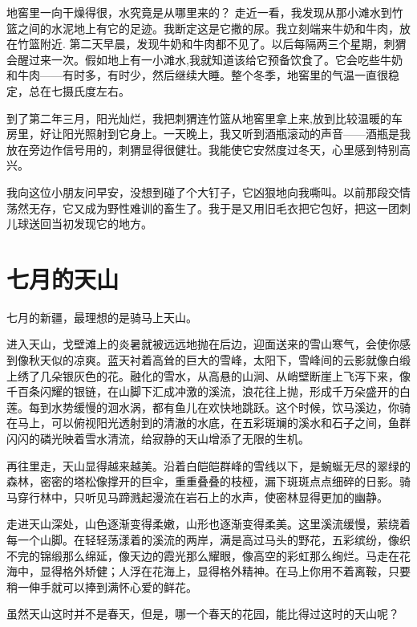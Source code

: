 \documentclass[12pt,UTF-8,openany]{ctexbook}
\begin{document}
\begin{large}
    地窖里一向干燥得很，水究竟是从哪里来的？ 走近一看，我发现从那小滩水到竹篮之间的水泥地上有它的足迹。我断定这是它撒的尿。我立刻端来牛奶和牛肉，放在竹篮附近. 第二天早晨，发现牛奶和牛肉都不见了。以后每隔两三个星期，刺猬会醒过来一次。假如地上有一小滩水,我就知道该给它预备饮食了。它会吃些牛奶和牛肉——有时多，有时少，然后继续大睡。整个冬季，地窖里的气温一直很稳定，总在七摄氏度左右。
    
    到了第二年三月，阳光灿烂，我把刺猬连竹篮从地窖里拿上来,放到比较温暖的车房里，好让阳光照射到它身上。一天晚上，我又听到酒瓶滚动的声音——酒瓶是我放在旁边作信号用的，刺猬显得很健壮。我能使它安然度过冬天，心里感到特别高兴。
    
    我向这位小朋友问早安，没想到碰了个大钉子，它凶狠地向我嘶叫。以前那段交情荡然无存，它又成为野性难训的畜生了。我于是又用旧毛衣把它包好，把这一团刺儿球送回当初发现它的地方。
    
\end{large}



\chapter{七月的天山}

\begin{large}
    
    七月的新疆，最理想的是骑马上天山。
    
    进入天山，戈壁滩上的炎暑就被远远地抛在后边，迎面送来的雪山寒气，会使你感到像秋天似的凉爽。蓝天衬着高耸的巨大的雪峰，太阳下，雪峰间的云影就像白缎上绣了几朵银灰色的花。融化的雪水，从高悬的山涧、从峭壁断崖上飞泻下来，像千百条闪耀的银链，在山脚下汇成冲激的溪流，浪花往上抛，形成千万朵盛开的白莲。每到水势缓慢的洄水涡，都有鱼儿在欢快地跳跃。这个时候，饮马溪边，你骑在马上，可以俯视阳光透射到的清澈的水底，在五彩斑斓的溪水和石子之间，鱼群闪闪的磷光映着雪水清流，给寂静的天山增添了无限的生机。
    
    再往里走，天山显得越来越美。沿着白皑皑群峰的雪线以下，是蜿蜒无尽的翠绿的森林，密密的塔松像撑开的巨伞，重重叠叠的枝桠，漏下斑斑点点细碎的日影。骑马穿行林中，只听见马蹄溅起漫流在岩石上的水声，使密林显得更加的幽静。
    
    走进天山深处，山色逐渐变得柔嫩，山形也逐渐变得柔美。这里溪流缓慢，萦绕着每一个山脚。在轻轻荡漾着的溪流的两岸，满是高过马头的野花，五彩缤纷，像织不完的锦缎那么绵延，像天边的霞光那么耀眼，像高空的彩虹那么绚烂。马走在花海中，显得格外矫健；人浮在花海上，显得格外精神。在马上你用不着离鞍，只要稍一伸手就可以捧到满怀心爱的鲜花。
    
    虽然天山这时并不是春天，但是，哪一个春天的花园，能比得过这时的天山呢？
    
\end{large}
\end{document}

